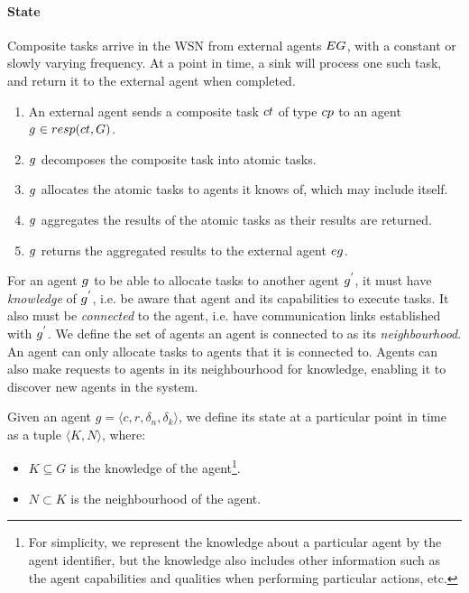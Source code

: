 \paragraph{State}

Composite tasks arrive in the WSN from external agents $\setExternalAgent{}{}$, with a constant or slowly varying frequency. At a point in time, a sink will process one such task, and return it to the external agent when completed.
\begin{enumerate}
	\item An external agent sends a composite task $\varCompositeTask{}{}$ of type $\varCompositeTaskType{}{}$ to an agent $\varAgent{}{} \in \functionTaskResponsibilities{}{}$. 
	\item $g_{}^{}$ decomposes the composite task into atomic tasks.
	\item $g_{}^{}$ allocates the atomic tasks to agents it knows of, which may include itself.
	\item $g_{}^{}$ aggregates the results of the atomic tasks as their results are returned.
	\item $g_{}^{}$ returns the aggregated results to the external agent $\varExternalAgent{}{}$.
\end{enumerate}

For an agent $g_{}^{}$ to be able to allocate tasks to another agent $g_{}^{'}$, it must have \textit{knowledge} of $g_{}^{'}$, i.e. be aware that agent and its capabilities to execute tasks. It also must be \textit{connected} to the agent, i.e. have communication links established with $g_{}^{'}$. We define the set of agents an agent is connected to as its \textit{neighbourhood}. An agent can only allocate tasks to agents that it is connected to. Agents can also make requests to agents in its neighbourhood for knowledge, enabling it to discover new agents in the system.
 

\begin{definition}
	\label{def:agent-state}
	Given an agent $g=\langle c, r, \delta_n, \delta_k \rangle$, we define its state at a particular point in time as a tuple $\langle K, N\rangle$, where:
	\begin{itemize}
		\item $K\subseteq G$ is the knowledge of the agent\footnote{For simplicity, we represent the knowledge about a particular agent by the agent identifier, but the knowledge also includes other information such as the agent capabilities and qualities when performing particular actions, etc. }.
		\item $N\subset K$ is the neighbourhood of the agent.
	\end{itemize}
\end{definition}

